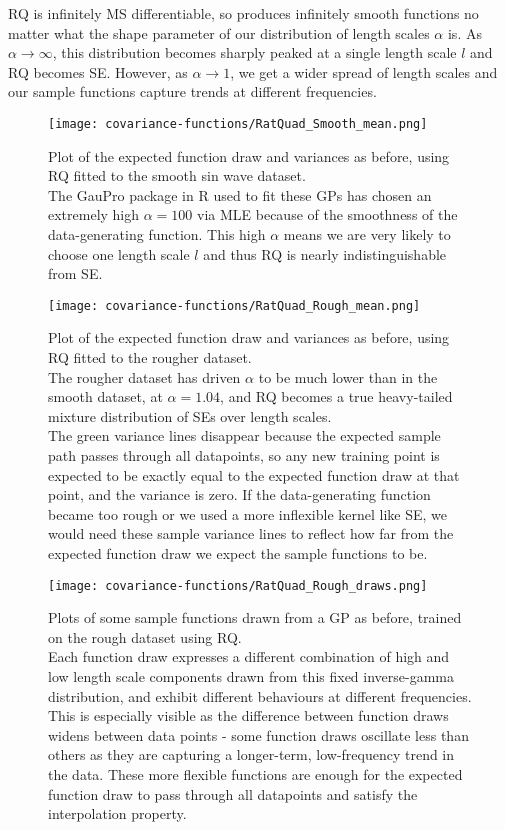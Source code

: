 RQ is infinitely MS differentiable, so produces infinitely smooth functions no matter what the shape parameter of our distribution of length scales $\alpha$ is. As $\alpha \to \infty$, this distribution becomes sharply peaked at a single length scale $l$ and RQ becomes SE. However, as $\alpha \to 1$, we get a wider spread of length scales and our sample functions capture trends at different frequencies. 

\begin{figure}[H]
    \texttt{[image: covariance-functions/RatQuad\_Smooth\_mean.png]}
    \caption{
        Plot of the expected function draw and variances as before, using RQ fitted to the smooth sin wave dataset. \\
        The GauPro package \cite{gaupro} in R used to fit these GPs has chosen an extremely high $\alpha = 100$ via MLE because of the smoothness of the data-generating function. This high $\alpha$ means we are very likely to choose one length scale $l$ and thus RQ is nearly indistinguishable from SE.
    }
\end{figure}

\begin{figure}[H]
    \texttt{[image: covariance-functions/RatQuad\_Rough\_mean.png]}
    \caption{
        Plot of the expected function draw and variances as before, using RQ fitted to the rougher dataset. \\
        The rougher dataset has driven $\alpha$ to be much lower than in the smooth dataset, at $\alpha = 1.04$, and RQ becomes a true heavy-tailed mixture distribution of SEs over length scales. \\
        The green variance lines disappear because the expected sample path passes through all datapoints, so any new training point is expected to be exactly equal to the expected function draw at that point, and the variance is zero. If the data-generating function became too rough or we used a more inflexible kernel like SE, we would need these sample variance lines to reflect how far from the expected function draw we expect the sample functions to be. \\ 
    }
\end{figure}

\begin{figure}[H]
    \texttt{[image: covariance-functions/RatQuad\_Rough\_draws.png]}
    \caption{
        Plots of some sample functions drawn from a GP as before, trained on the rough dataset using RQ. \\
        Each function draw expresses a different combination of high and low length scale components drawn from this fixed inverse-gamma distribution, and exhibit different behaviours at different frequencies. This is especially visible as the difference between function draws widens between data points - some function draws oscillate less than others as they are capturing a longer-term, low-frequency trend in the data. These more flexible functions are enough for the expected function draw to pass through all datapoints and satisfy the interpolation property.
    }
\end{figure}


